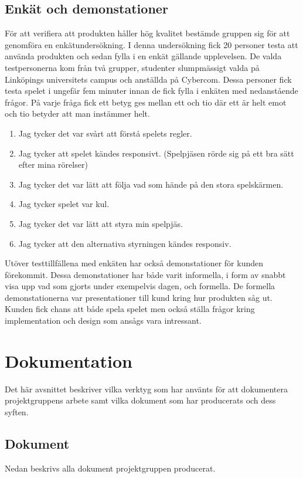 \subsection{Enkät och demonstationer}
\label{sec:method-poll}
För att verifiera att produkten håller hög kvalitet bestämde gruppen sig för att genomföra en enkätundersökning. I denna undersökning fick 20 personer testa att använda produkten och sedan fylla i en enkät gällande upplevelsen. De valda testpersonerna kom från två grupper, studenter slumpmässigt valda på Linköpings universitets campus och anställda på Cybercom. Dessa personer fick testa spelet i ungefär fem minuter innan de fick fylla i enkäten med nedanstående frågor. På varje fråga fick ett betyg ges mellan ett och tio där ett är helt emot och tio betyder att man instämmer helt.


\begin{enumerate}[label={(\alph*)}]
	\item Jag tycker det var svårt att förstå spelets regler.
	\item Jag tycker att spelet kändes responsivt. (Spelpjäsen rörde sig på ett bra sätt efter mina rörelser)
	\item Jag tycker det var lätt att följa vad som hände på den stora spelskärmen.
	\item Jag tycker spelet var kul.
	\item Jag tycker det var lätt att styra min spelpjäs.
	\item Jag tycker att den alternativa styrningen kändes responsiv.
\end{enumerate}

Utöver testtillfällena med enkäten har också demonstationer för kunden förekommit. Dessa demonstationer har både varit informella, i form av snabbt visa upp vad som gjorts under exempelvis dagen, och formella. De formella demonstationerna var presentationer till kund kring hur produkten såg ut. Kunden fick chans att både spela spelet men också ställa frågor kring implementation och design som ansågs vara intressant.


\section{Dokumentation}
\label{sec:method-documentation}
Det här avsnittet beskriver vilka verktyg som har använts för att dokumentera projektgruppens arbete samt vilka dokument som har producerats och dess syften.

\subsection{Dokument}
Nedan beskrivs alla dokument projektgruppen producerat.

